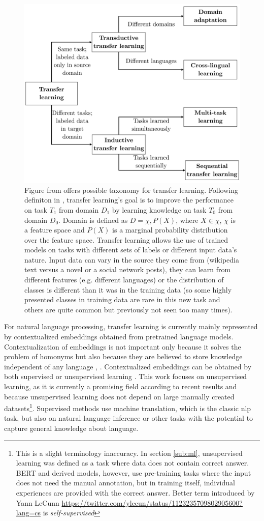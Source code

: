 \begin{figure}[ht]
\centering
\includegraphics[width=0.7\columnwidth]{../img/tl_taxonomy}
\caption{Figure from \protect\citep{Ruder2019} offers possible taxonomy for transfer learning. %
Following definiton in \citep{Pan2009}, transfer learning's goal is to improve the performance on task $T_1$ from domain $D_1$ by learning knowledge on task $T_0$ from domain $D_0$. Domain is defined as $D = {\chi,P(X)}$, where $X \in \chi$, $\chi$ is a feature space and $P(X)$ is a marginal probability distribution over the feature space. Transfer learning allows the use of trained models on tasks with different sets of labels or different input data's nature. Input data can vary in the source they come from (wikipedia text versus a novel or a social network posts), they can learn from different features (e.g. different languages) or the distribution of classes is different than it was in the training data (so some highly presented classes in training data are rare in this new task and others are quite common but previously not seen too many times).
}
\label{pic:tl_taxonomy}
\end{figure}
For natural language processing, transfer learning is currently mainly represented by contextualized embeddings obtained from pretrained language models.
Contextualization of embeddings is not important only because it solves the problem of homonyms but also because they are believed to store knowledge independent of any language \citep{Feijo2020}, \citep{Hewitt2020}. Contextualized embeddings can be obtained by both supervised or unsupervised learning \citep{Liu2020}. This work focuses on unsupervised learning, as it is currently a promising field according to recent results and because unsupervised learning does not depend on large manually created datasets\footnote{This is a slight terminology inaccuracy. In section \ref{sub:ml}, unsupervised learning was defined as a task where data does not contain correct answer. BERT and derived models, however, use pre-training tasks where the input does not need the manual annotation, but in training itself, individual experiences are provided with the correct answer. Better term introduced by Yann LeCunn \url{https://twitter.com/ylecun/status/1123235709802905600?lang=cs} is \textit{self-supervised}}. Supervised methods use machine translation, which is the classic \acrshort{nlp} task, but also on natural language inference or other tasks with the potential to capture general knowledge about language.
